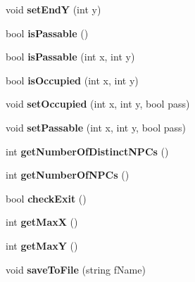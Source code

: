 \begin{DoxyCompactItemize}
\item 
\hypertarget{class_map_screen_a442a043c7ef47c4fe82d58deef54cb65}{}\label{class_map_screen_a442a043c7ef47c4fe82d58deef54cb65} 
void {\bfseries set\+EndY} (int y)
\item 
\hypertarget{class_map_screen_a86de80d62cbd8c0acea2ed33998c396b}{}\label{class_map_screen_a86de80d62cbd8c0acea2ed33998c396b} 
bool {\bfseries is\+Passable} ()
\item 
\hypertarget{class_map_screen_acf34be7d25ac28d475d748b22a952df0}{}\label{class_map_screen_acf34be7d25ac28d475d748b22a952df0} 
bool {\bfseries is\+Passable} (int x, int y)
\item 
\hypertarget{class_map_screen_aa73a3953e6698f7ea827c3c2c1c5ec35}{}\label{class_map_screen_aa73a3953e6698f7ea827c3c2c1c5ec35} 
bool {\bfseries is\+Occupied} (int x, int y)
\item 
\hypertarget{class_map_screen_a4583f04d132ce365ff609a4c2f204afb}{}\label{class_map_screen_a4583f04d132ce365ff609a4c2f204afb} 
void {\bfseries set\+Occupied} (int x, int y, bool pass)
\item 
\hypertarget{class_map_screen_a32c18aa83af5af7fab6e07f90869a458}{}\label{class_map_screen_a32c18aa83af5af7fab6e07f90869a458} 
void {\bfseries set\+Passable} (int x, int y, bool pass)
\item 
\hypertarget{class_map_screen_a2a108e5d1fbe259c2027ef37e5940481}{}\label{class_map_screen_a2a108e5d1fbe259c2027ef37e5940481} 
int {\bfseries get\+Number\+Of\+Distinct\+N\+P\+Cs} ()
\item 
\hypertarget{class_map_screen_aee2e1392794eac96986bacbbe740cabb}{}\label{class_map_screen_aee2e1392794eac96986bacbbe740cabb} 
int {\bfseries get\+Number\+Of\+N\+P\+Cs} ()
\item 
\hypertarget{class_map_screen_a06feaaa9d453707bbf543f5794cf22c7}{}\label{class_map_screen_a06feaaa9d453707bbf543f5794cf22c7} 
bool {\bfseries check\+Exit} ()
\item 
\hypertarget{class_map_screen_a91dff80abc0d95a877d6a6ba289f4924}{}\label{class_map_screen_a91dff80abc0d95a877d6a6ba289f4924} 
int {\bfseries get\+MaxX} ()
\item 
\hypertarget{class_map_screen_a078b380601f48e4fefc83420f673d0f6}{}\label{class_map_screen_a078b380601f48e4fefc83420f673d0f6} 
int {\bfseries get\+MaxY} ()
\item 
\hypertarget{class_map_screen_a28cdac5ec3963d90af6adab6e12c7226}{}\label{class_map_screen_a28cdac5ec3963d90af6adab6e12c7226} 
void {\bfseries save\+To\+File} (string f\+Name)
\item 

\end{DoxyCompactItemize}
